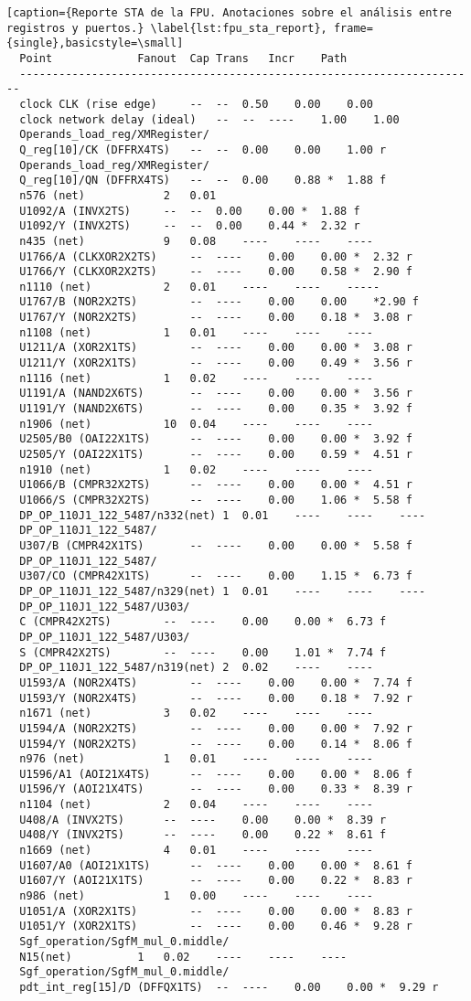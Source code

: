 \begin{lstlisting}[caption={Reporte STA de la FPU. Anotaciones sobre el análisis entre registros y puertos.} \label{lst:fpu_sta_report}, frame={single},basicstyle=\small]
  Point				Fanout	Cap	Trans	Incr	Path
  ----------------------------------------------------------------------
  clock CLK (rise edge)		--	--	0.50	0.00	0.00
  clock network delay (ideal)	--	--	----	1.00	1.00
  Operands_load_reg/XMRegister/
  Q_reg[10]/CK (DFFRX4TS)	--	--	0.00	0.00	1.00 r
  Operands_load_reg/XMRegister/
  Q_reg[10]/QN (DFFRX4TS)	--	--	0.00	0.88 *	1.88 f
  n576 (net)			2	0.01 
  U1092/A (INVX2TS)		--	--	0.00	0.00 *	1.88 f
  U1092/Y (INVX2TS)		--	--	0.00	0.44 *	2.32 r
  n435 (net)			9	0.08	---- 	----	----
  U1766/A (CLKXOR2X2TS)		--	----	0.00	0.00 *	2.32 r
  U1766/Y (CLKXOR2X2TS)		--	----	0.00	0.58 *	2.90 f
  n1110 (net)			2	0.01	----	----	-----
  U1767/B (NOR2X2TS)		--	----	0.00	0.00	*2.90 f
  U1767/Y (NOR2X2TS)		--	----	0.00	0.18 *	3.08 r
  n1108 (net)			1	0.01	----	----	----
  U1211/A (XOR2X1TS)		--	----	0.00	0.00 *	3.08 r
  U1211/Y (XOR2X1TS)		--	----	0.00	0.49 *	3.56 r
  n1116 (net)			1	0.02	----	----	----
  U1191/A (NAND2X6TS)		--	----	0.00	0.00 *	3.56 r
  U1191/Y (NAND2X6TS)		--	----	0.00	0.35 *	3.92 f
  n1906 (net)			10	0.04	----	----	----
  U2505/B0 (OAI22X1TS)		--	----	0.00	0.00 *	3.92 f
  U2505/Y (OAI22X1TS)		--	----	0.00	0.59 *	4.51 r
  n1910 (net)			1	0.02	----	----	---- 
  U1066/B (CMPR32X2TS)		--	----	0.00	0.00 *	4.51 r
  U1066/S (CMPR32X2TS)		--	----	0.00	1.06 *	5.58 f
  DP_OP_110J1_122_5487/n332(net) 1	0.01	----	----	----
  DP_OP_110J1_122_5487/
  U307/B (CMPR42X1TS)		--	----	0.00	0.00 *	5.58 f
  DP_OP_110J1_122_5487/
  U307/CO (CMPR42X1TS)		--	----	0.00	1.15 *	6.73 f
  DP_OP_110J1_122_5487/n329(net) 1	0.01	----	----	----
  DP_OP_110J1_122_5487/U303/
  C (CMPR42X2TS)		--	----	0.00	0.00 *	6.73 f
  DP_OP_110J1_122_5487/U303/
  S (CMPR42X2TS)		--	----	0.00	1.01 *	7.74 f
  DP_OP_110J1_122_5487/n319(net) 2	0.02	----	---- 
  U1593/A (NOR2X4TS)		--	----	0.00	0.00 *	7.74 f
  U1593/Y (NOR2X4TS)		--	----	0.00	0.18 *	7.92 r
  n1671 (net)			3	0.02	----	----	----
  U1594/A (NOR2X2TS)		--	----	0.00	0.00 *	7.92 r
  U1594/Y (NOR2X2TS)		--	----	0.00	0.14 *	8.06 f
  n976 (net)			1	0.01	----	----	---- 
  U1596/A1 (AOI21X4TS)		--	----	0.00	0.00 *	8.06 f
  U1596/Y (AOI21X4TS)		--	----	0.00	0.33 *	8.39 r
  n1104 (net)			2	0.04	----	----	---- 
  U408/A (INVX2TS)		--	----	0.00	0.00 *	8.39 r
  U408/Y (INVX2TS)		--	----	0.00	0.22 *	8.61 f
  n1669 (net)			4	0.01	----	----	---- 
  U1607/A0 (AOI21X1TS)		--	----	0.00	0.00 *	8.61 f
  U1607/Y (AOI21X1TS)		--	----	0.00	0.22 *	8.83 r
  n986 (net)			1	0.00	----	----	---- 
  U1051/A (XOR2X1TS)		--	----	0.00	0.00 *	8.83 r
  U1051/Y (XOR2X1TS)		--	----	0.00	0.46 *	9.28 r
  Sgf_operation/SgfM_mul_0.middle/
  N15(net)			1	0.02	----	----	----
  Sgf_operation/SgfM_mul_0.middle/
  pdt_int_reg[15]/D (DFFQX1TS)	--	----	0.00	0.00 *	9.29 r
  

\end{lstlisting}
